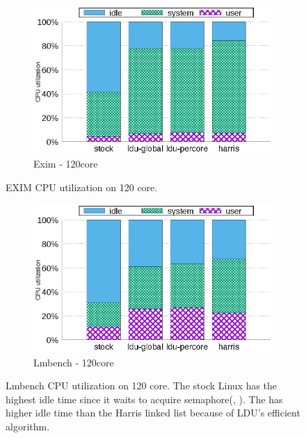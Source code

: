 \begin{figure}[tb]
    \centering
    \begin{subfigure}[b]{1\textwidth}
  \begin{center}
        \includegraphics[scale=0.8]{graph/exim_cpuutils.eps}
        \caption{Exim - 120core}
  \end{center}
    \end{subfigure}
    \centering
    \caption{EXIM CPU utilization on 120 core. }
    \label{fig:utilization_exim}
    
\end{figure}



\begin{figure}[tb]
    \centering
    \begin{subfigure}[b]{1\textwidth}
  \begin{center}
        \includegraphics[scale=0.8]{graph/lmbench_cpuutils.eps}
        \caption{Lmbench - 120core}
  \end{center}
    \end{subfigure}
        \centering
    \caption{Lmbench CPU utilization on 120 core. The stock Linux has the
    highest idle time since it waits to acquire semaphore(, ).
    The \LDU has higher idle time than the Harris linked list because of LDU's efficient algorithm.}
    \label{fig:utilization_lmbench}
    
\end{figure}



